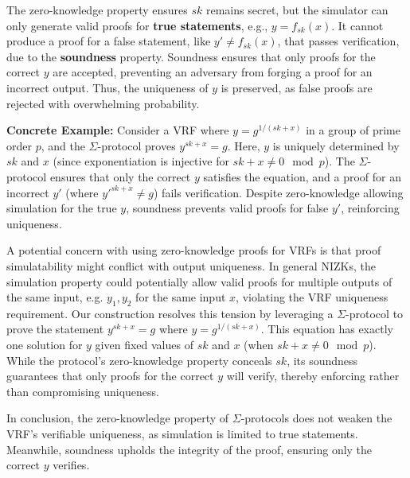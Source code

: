 The zero-knowledge property ensures $sk$ remains secret, but the simulator can only generate valid proofs for \textbf{true statements}, e.g., $y = f_{sk}(x)$. It cannot produce a proof for a false statement, like $y' \neq f_{sk}(x)$, that passes verification, due to the \textbf{soundness} property. Soundness ensures that only proofs for the correct $y$ are accepted, preventing an adversary from forging a proof for an incorrect output. Thus, the uniqueness of $y$ is preserved, as false proofs are rejected with overwhelming probability.

\textbf{Concrete Example:} Consider a VRF where $y = g^{1/(sk + x)}$ in a group of prime order $p$, and the $\Sigma$-protocol proves $y^{sk + x} = g$. Here, $y$ is uniquely determined by $sk$ and $x$ (since exponentiation is injective for $sk + x \neq 0 \mod p$). The $\Sigma$-protocol ensures that only the correct $y$ satisfies the equation, and a proof for an incorrect $y'$ (where $y'^{sk + x} \neq g$) fails verification. Despite zero-knowledge allowing simulation for the true $y$, soundness prevents valid proofs for false $y'$, reinforcing uniqueness.

A potential concern with using zero-knowledge proofs for VRFs is that proof simulatability might conflict with output uniqueness. In general NIZKs, the simulation property could potentially allow valid proofs for multiple outputs of the same input, e.g. $y_1, y_2$ for the same input $x$, violating the VRF uniqueness requirement. Our construction resolves this tension by leveraging a $\Sigma$-protocol to prove the statement $y^{sk + x} = g$ where $y = g^{1/(sk + x)}$. This equation has exactly one solution for $y$ given fixed values of $sk$ and $x$ (when $sk + x \neq 0 \mod p$). While the protocol's zero-knowledge property conceals $sk$, its soundness guarantees that only proofs for the correct $y$ will verify, thereby enforcing rather than compromising uniqueness.


In conclusion, the zero-knowledge property of $\Sigma$-protocols does not weaken the VRF's verifiable uniqueness, as simulation is limited to true statements. Meanwhile, soundness upholds the integrity of the proof, ensuring only the correct $y$ verifies.